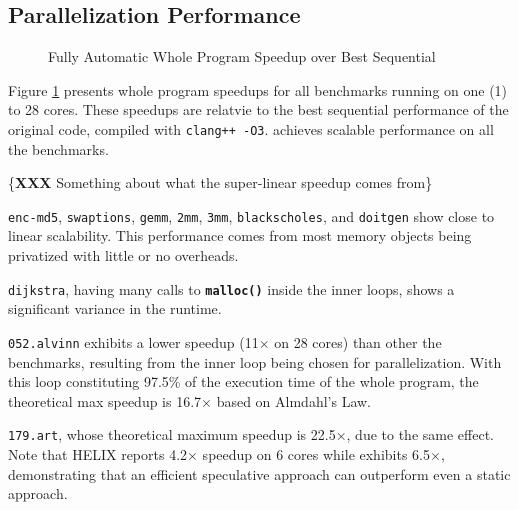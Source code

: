 \subsection{Parallelization Performance}

\begin{figure}[ht]
  \centering
  \caption{Fully Automatic Whole Program Speedup over Best Sequential}
  \label{fig:multi-core-scale}
\end{figure}

Figure \ref{fig:multi-core-scale} presents whole program speedups for
all benchmarks running on one (1) to 28 cores. These speedups are
relatvie to the best sequential performance of the original code, compiled
with \texttt{clang++ -O3}. \name achieves scalable performance on all the
benchmarks.

\{\textbf{XXX} Something about what the super-linear speedup comes from\}

\texttt{enc-md5}, \texttt{swaptions}, \texttt{gemm}, \texttt{2mm},
\texttt{3mm}, \texttt{blackscholes}, and \texttt{doitgen} show
close to linear scalability. This performance comes from most memory
objects being privatized with little or no overheads.

\texttt{dijkstra}, having many calls to \texttt{\textbf{malloc()}}
inside the inner loops, shows a significant variance in
the runtime.

\texttt{052.alvinn} exhibits a lower speedup (11$\times$ on 28
cores) than other the benchmarks, resulting from the inner loop
being chosen for parallelization. With this loop constituting 97.5\% of the
execution time of the whole program, the theoretical max speedup is 16.7$\times$
based on Almdahl's Law.

\texttt{179.art}, whose theoretical maximum speedup is 22.5$\times$, due to
the same effect. Note that HELIX\cite{simone:12:cgo} reports 4.2$\times$ speedup
on 6 cores while \name exhibits 6.5$\times$, demonstrating that an efficient
speculative approach can outperform even a static approach.

